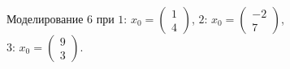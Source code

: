 \documentclass[a5paper, 10pt]{article}
\theoremstyle{definition}
\theoremstyle{plain}
\theoremstyle{remark}
\begin{document}
\begin{figure}[h!]
\caption{Моделирование 6 при  $1: \, x_0 = \begin{pmatrix} 1 \\ 4 \end{pmatrix}$, $2: \, x_0 = \begin{pmatrix} -2 \\ 7 \end{pmatrix}$, $3: \, x_0 = \begin{pmatrix} 9 \\ 3 \end{pmatrix}$.}
\end{figure}
\end{document}
